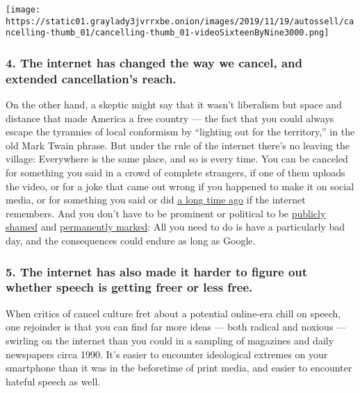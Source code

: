 \texttt{[image: https://static01.graylady3jvrrxbe.onion/images/2019/11/19/autossell/cancelling-thumb\_01/cancelling-thumb\_01-videoSixteenByNine3000.png]}

\hypertarget{4-the-internet-has-changed-the-way-we-cancel-and-extended-cancellations-reach}{%
\subsubsection{4. The internet has changed the way we cancel, and
extended cancellation's
reach.}\label{4-the-internet-has-changed-the-way-we-cancel-and-extended-cancellations-reach}}

On the other hand, a skeptic might say that it wasn't liberalism but
space and distance that made America a free country --- the fact that
you could always escape the tyrannies of local conformism by ``lighting
out for the territory,'' in the old Mark Twain phrase. But under the
rule of the internet there's no leaving the village: Everywhere is the
same place, and so is every time. You can be canceled for something you
said in a crowd of complete strangers, if one of them uploads the video,
or for a joke that came out wrong if you happened to make it on social
media, or for something you said or did
\href{https://www.nytimes3xbfgragh.onion/reuters/2020/07/02/business/02reuters-boeing-resignation.html}{a
long time ago} if the internet remembers. And you don't have to be
prominent or political to be
\href{https://www.penguinrandomhouse.com/books/306321/so-youve-been-publicly-shamed-by-jon-ronson/}{publicly
shamed} and
\href{https://www.nytimes3xbfgragh.onion/2018/10/23/nyregion/man-found-dead-in-car-new-york.html}{permanently
marked}: All you need to do is have a particularly bad day, and the
consequences could endure as long as Google.

\hypertarget{5-the-internet-has-also-made-it-harder-to-figure-out-whether-speech-is-getting-freer-or-less-free}{%
\subsubsection{5. The internet has also made it harder to figure out
whether speech is getting freer or less
free.}\label{5-the-internet-has-also-made-it-harder-to-figure-out-whether-speech-is-getting-freer-or-less-free}}

When critics of cancel culture fret about a potential online-era chill
on speech, one rejoinder is that you can find far more ideas --- both
radical and noxious --- swirling on the internet than you could in a
sampling of magazines and daily newspapers circa 1990. It's easier to
encounter ideological extremes on your smartphone than it was in the
beforetime of print media, and easier to encounter hateful speech as
well.

